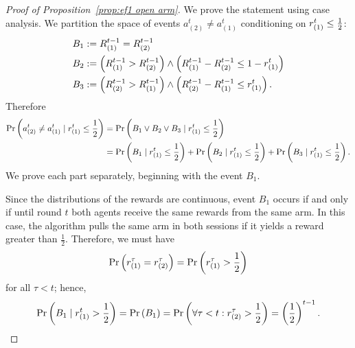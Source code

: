 \begin{proof}[Proof of Proposition~\ref{prop:ef1 open arm}]
We prove the statement using case analysis. We partition the space of events $a^t_{(2)} \neq a^t_{(1)}$ conditioning on $r_{(1)}^t \leq \frac{1}{2}$:
\begin{align*}
    &B_1 := R^{t-1}_{(1)} = R^{t-1}_{(2)} \\
    &B_2 := \left(R^{t-1}_{(1)} > R^{t-1}_{(2)} \right) \wedge \left( R^{t-1}_{(1)} - R^{t-1}_{(2)} \leq 1 - r_{(1)}^t \right) \\
    &B_3 := \left( R^{t-1}_{(2)} > R^{t-1}_{(1)} \right) \wedge  \left( R^{t-1}_{(2)} - R^{t-1}_{(1)} \leq r_{(1)}^t \right).
\end{align*}
Therefore
\begin{align*}
    \Pr\left( a^t_{(2)} \neq a^t_{(1)} \mid r_{(1)}^t \leq \frac{1}{2} \right) & = \Pr\left(  B_1\vee B_2 \vee B_3  \mid r_{(1)}^t \leq \frac{1}{2} \right)
    \\& = \Pr\left( B_1 \mid r_{(1)}^t \leq \frac{1}{2}  \right) + \Pr\left( B_2 \mid r_{(1)}^t \leq \frac{1}{2}  \right) + \Pr\left( B_3 \mid r_{(1)}^t \leq \frac{1}{2}  \right).
\end{align*}
We prove each part separately, beginning with the event $B_1$.

Since the distributions of the rewards are continuous, event $B_1$ occurs if and only if until round $t$ both agents receive the same rewards from the same arm.
In this case, the algorithm pulls the same arm in both sessions if it yields a reward greater than $\frac{1}{2}$.
Therefore, we must have
\[
    \Pr\left( r_{(1)}^\tau  = r_{(2)}^\tau \right) = \Pr\left( r_{(1)}^\tau  > \frac{1}{2} \right)
\]
for all $\tau < t$; hence,
\begin{align}\label{B1}
\Pr\left( B_1 \mid r_{(1)}^t > \frac{1}{2} \right) =\Pr\left( B_1 \right) = \Pr\left( \forall \tau<t : r_{(2)}^\tau > \frac{1}{2} \right) = \left(\frac{1}{2}\right)^{t-1}.
\end{align}


\end{proof}

